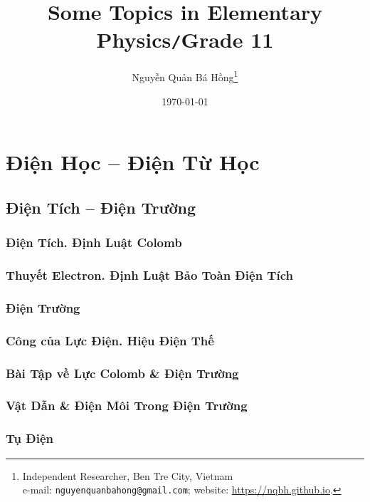 \documentclass[oneside]{book}
\title{Some Topics in Elementary Physics\texttt{/}Grade 11}
\author{Nguyễn Quản Bá Hồng\footnote{Independent Researcher, Ben Tre City, Vietnam\\e-mail: \texttt{nguyenquanbahong@gmail.com}; website: \url{https://nqbh.github.io}.}}
\date{\today}
\numberwithin{equation}{section}
\begin{document}
\frontmatter
\maketitle
\setcounter{secnumdepth}{4}
\setcounter{tocdepth}{3}
\tableofcontents
\newpage


\mainmatter

\part{Điện Học -- Điện Từ Học}

\chapter{Điện Tích -- Điện Trường}

\section{Điện Tích. Định Luật Colomb}

\section{Thuyết Electron. Định Luật Bảo Toàn Điện Tích}

\section{Điện Trường}

\section{Công của Lực Điện. Hiệu Điện Thế}

\section{Bài Tập về Lực Colomb \& Điện Trường}

\section{Vật Dẫn \& Điện Môi Trong Điện Trường}

\section{Tụ Điện}
\end{document}
